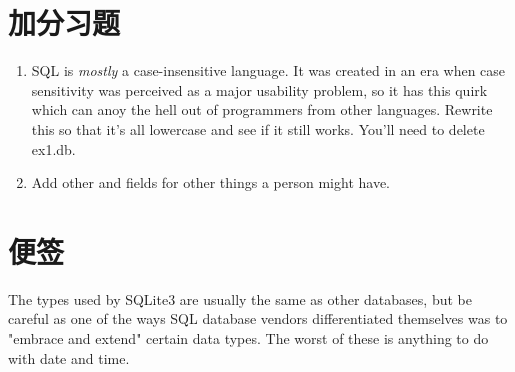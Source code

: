 \section{加分习题}

\begin{enumerate}
\item SQL is \emph{mostly} a case-insensitive language. It was created in an
    era when case sensitivity was perceived as a major usability problem, so
    it has this quirk which can anoy the hell out of programmers from other
    languages.  Rewrite this so that it's all lowercase and see if it still
    works.  You'll need to delete ex1.db.
\item Add other  and  fields for other things
    a person might have.
\end{enumerate}

\section{便签}

The types used by SQLite3 are usually the same as other databases, but be
careful as one of the ways SQL database vendors differentiated themselves was
to "embrace and extend" certain data types.  The worst of these is anything
to do with date and time.
